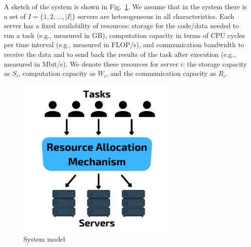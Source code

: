 A sketch of the system is shown in Fig.~\ref{fig:system_model}.
We assume that in the system there is a set of $I = \{1,2,\ldots,\left|I\right|\}$ servers are heterogeneous in all
characteristics. Each server has a fixed availability of resources: storage for the code/data needed to run a task
(e.g., measured in GB), computation capacity in terms of CPU cycles per time interval (e.g., measured in FLOP/s),
and communication bandwidth to receive the data and to send back the results of the task after execution
(e.g., measured in Mbit/s). We denote these resources for server $i$: the storage capacity as $S_i$, computation
capacity as $W_i$, and the communication capacity as $R_i$.

\begin{figure}
    \centering
    \includegraphics[width=8cm]{figures/system_model.pdf}
    \caption{System model}
    \label{fig:system_model}
\end{figure}

